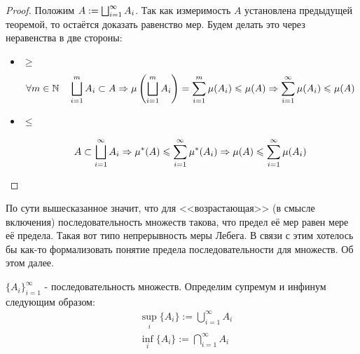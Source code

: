 \begin{proof}
	Положим $A := \bigsqcup_{i = 1}^\infty A_i$. Так как измеримость $A$ установлена предыдущей теоремой, то остаётся доказать равенство мер. Будем делать это через неравенства в две стороны:
	\begin{itemize}
		\item $\ge$
		\[
			\forall m \in \mathbb{N} \quad \bigsqcup_{i = 1}^m A_i \subset A \Rightarrow \mu\left(\bigsqcup_{i = 1}^m A_i\right) = \sum_{i = 1}^m \mu(A_i) \leqslant \mu(A) \Rightarrow \sum_{i = 1}^\infty \mu(A_i) \leqslant \mu(A)
		\]
		
		\item $\le$
		
		\[
			A \subset \bigsqcup_{i = 1}^\infty A_i \Rightarrow \mu^*(A) \leqslant \sum_{i = 1}^\infty \mu^*(A_i) \Rightarrow \mu(A) \leqslant \sum_{i = 1}^\infty \mu(A_i)
		\]
	\end{itemize}
\end{proof}

\begin{note}
	По сути вышесказанное значит, что для <<возрастающая>> (в смысле включения) последовательность множеств такова, что предел её мер равен мере её предела. Такая вот типо непрерывность меры Лебега. В связи с этим хотелось бы как-то формализовать понятие предела последовательности для множеств. Об этом далее. 	
\end{note}
\begin{definition}
	$\{A_i\}_{i = 1}^\infty$ - последовательность множеств. Определим супремум и инфинум следующим образом:
	\begin{align*}
		&{\sup_i \{A_i\} := \bigcup_{i = 1}^\infty A_i}
		\\
		&{\inf_i \{A_i\} := \bigcap_{i = 1}^\infty A_i}
	\end{align*}
\end{definition}

